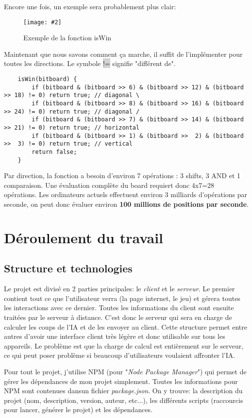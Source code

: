 \documentclass[a4paper]{article}
\newcommand{\img}[3][]{
    \begin{figure}[H]
        \centering
        \texttt{[image: \#2]}
        \caption{#1}    
    \end{figure}
}
\newcommand{\inlinecode}[1]{\colorbox{lightgray}{#1}}
\begin{document}
    Encore une fois, un exemple sera probablement plus clair:
    \img[Exemple de la fonction isWin]{Images/ExempleIsWin.png}{0.8}

    Maintenant que nous savons comment ça marche, il suffit de l'implémenter pour toutes les directions. Le symbole \inlinecode{!=} signifie "différent de".
    \begin{lstlisting}
    isWin(bitboard) {
        if (bitboard & (bitboard >> 6) & (bitboard >> 12) & (bitboard >> 18) != 0) return true; // diagonal \
        if (bitboard & (bitboard >> 8) & (bitboard >> 16) & (bitboard >> 24) != 0) return true; // diagonal /
        if (bitboard & (bitboard >> 7) & (bitboard >> 14) & (bitboard >> 21) != 0) return true; // horizontal
        if (bitboard & (bitboard >> 1) & (bitboard >>  2) & (bitboard >>  3) != 0) return true; // vertical
        return false;
    }
    \end{lstlisting}

    Par direction, la fonction a besoin d'environ 7 opérations : 3 shifts, 3 AND et 1 comparaison. Une évaluation complète du board requiert donc 4x7=28 opérations. Les ordinateurs actuels effectuent environ 3 milliards d'opérations par seconde, on peut donc évaluer environ \textbf{100 millions de positions par seconde}.

\section{Déroulement du travail}

\subsection{Structure et technologies}

	Le projet est divisé en 2 parties principales: le \textit{client} et le \textit{serveur}. Le premier contient tout ce que l'utilisateur verra (la page internet, le jeu) et gérera toutes les interactions avec ce dernier. Toutes les informations du client sont ensuite traitées par le serveur à distance. C'est donc le serveur qui sera en charge de calculer les coups de l'IA et de les envoyer au client. Cette structure permet entre autres d'avoir une interface client très légère et donc utilisable sur tous les appareils. Le problème est que la charge de calcul est entièrement sur le serveur, ce qui peut poser problème si beaucoup d'utilisateurs voulaient affronter l'IA.

	Pour tout le projet, j'utilise NPM (pour  "\textit{Node Package Manager}") qui permet de gérer les dépendances de mon projet simplement. Toutes les informations pour NPM sont contenues dansun fichier \textit{package.json}. On y trouve: la description du projet (nom, description, version, auteur, etc...), les différents scripts (raccourcis pour lancer, générer le projet) et les dépendances.
\end{document}
